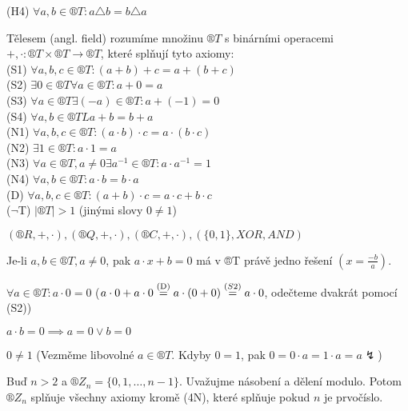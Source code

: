 \documentclass[12pt]{article}					%
\begin{document}
    \begin{poznamka}
        (H4) $\forall a, b \in ®T: a\triangle b = b\triangle a$
    \end{poznamka}

    \begin{definice}[Těleso]
        Tělesem (angl. field) rozumíme množinu $®T$ s binárními operacemi $+, \cdot : ®T\times ®T \rightarrow ®T$, které splňují tyto axiomy:\\
        (S1) $\forall a, b, c \in ®T: (a+b)+c = a+(b+c)$\\
        (S2) $\exists 0\in ®T \forall a \in ®T: a+0 = a$\\
        (S3) $\forall a \in ®T \exists (-a) \in ®T: a+(-1) = 0$\\
        (S4) $\forall a, b \in ®TL a+b = b+a$\\
        (N1) $\forall a, b, c \in ®T: (a\cdot b)\cdot c = a\cdot (b\cdot c)$\\
        (N2) $\exists 1 \in ®T: a\cdot 1 = a$\\
        (N3) $\forall a \in ®T, a≠0 \exists a^{-1}\in®T: a\cdot a^{-1} = 1$\\
        (N4) $\forall a,b \in ®T: a\cdot b = b\cdot a$\\
        (D) $\forall a,b,c \in ®T: (a+b)\cdot c = a\cdot c + b\cdot c$\\
        ($\neg$T) $|®T|>1$ (jinými slovy $0 ≠ 1$)

    \end{definice}
    
    \begin{priklady}
        $(®R, +, \cdot), (®Q, +, \cdot), (®C, +, \cdot), (\{0, 1\}, XOR, AND)$
    \end{priklady}

    \begin{tvrzeni}
        Je-li $a, b \in ®T, a≠0$, pak $a\cdot x+b = 0$ má v ®T právě jedno řešení $(x = \frac{-b}{a})$.

        $\forall a\in ®T: a\cdot 0 = 0$ ($a\cdot 0 + a\cdot 0 \stackrel{\text{(D)}}{=} a\cdot(0+0) \stackrel{\text(S2)}{=} a\cdot 0$, odečteme dvakrát pomocí (S2))

        $a\cdot b = 0 \implies a = 0 \lor b=0$

        $0 ≠ 1$ (Vezměme libovolné $a \in ®T$. Kdyby $0=1$, pak $0 = 0\cdot a = 1\cdot a = a \lightning$)
    \end{tvrzeni}

    \begin{priklady}
        Buď $n>2$ a $®Z_n = \{0,1,…,n-1\}$. Uvažujme násobení a dělení modulo. Potom $®Z_n$ splňuje všechny axiomy kromě (4N), které splňuje pokud $n$ je prvočíslo.
    \end{priklady}
\end{document}
